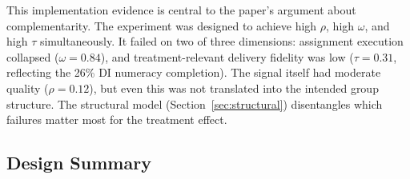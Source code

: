 \documentclass[11pt]{article}
\begin{document}
This implementation evidence is central to the paper's argument about complementarity. The experiment was designed to achieve high $\rho$, high $\omega$, and high $\tau$ simultaneously. It failed on two of three dimensions: assignment execution collapsed ($\omega = 0.84$), and treatment-relevant delivery fidelity was low ($\tau = 0.31$, reflecting the 26\% DI numeracy completion). The signal itself had moderate quality ($\rho = 0.12$), but even this was not translated into the intended group structure. The structural model (Section~\ref{sec:structural}) disentangles which failures matter most for the treatment effect.

\subsection{Design Summary}
\end{document}
